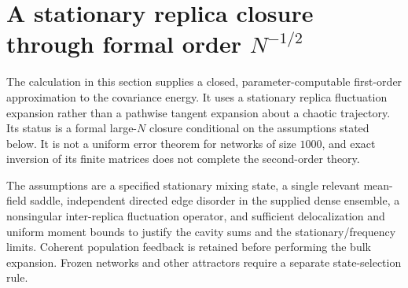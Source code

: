\providecommand{\E}{\mathbb E}
\providecommand{\dd}{\mathrm d}
\providecommand{\diag}{\operatorname{diag}}

\section{A stationary replica closure through formal order $N^{-1/2}$}
\label{sec:adopted-stationary}

The calculation in this section supplies a closed, parameter-computable
first-order approximation to the covariance energy. It uses a stationary
replica fluctuation expansion rather than a pathwise tangent expansion about
a chaotic trajectory. Its status is a formal large-$N$ closure conditional on
the assumptions stated below. It is not a uniform error theorem for networks
of size $1000$, and exact inversion of its finite matrices does not complete
the second-order theory.

The assumptions are a specified stationary mixing state, a single relevant
mean-field saddle, independent directed edge disorder in the supplied dense
ensemble, a nonsingular inter-replica fluctuation operator, and sufficient
delocalization and uniform moment bounds to justify the cavity sums and the
stationary/frequency limits. Coherent population feedback is retained before
performing the bulk expansion. Frozen networks and other attractors require
a separate state-selection rule.

